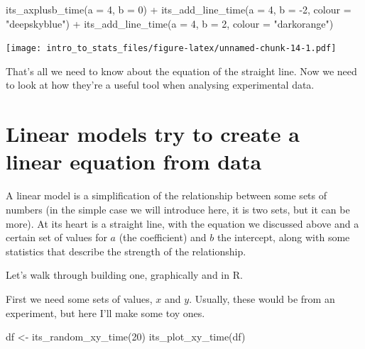 \documentclass[
]{book}
\newenvironment{Shaded}{\begin{snugshade}}{\end{snugshade}}
\newcommand{\AttributeTok}[1]{\textcolor[rgb]{0.77,0.63,0.00}{#1}}
\newcommand{\DecValTok}[1]{\textcolor[rgb]{0.00,0.00,0.81}{#1}}
\newcommand{\FunctionTok}[1]{\textcolor[rgb]{0.00,0.00,0.00}{#1}}
\newcommand{\NormalTok}[1]{#1}
\newcommand{\OtherTok}[1]{\textcolor[rgb]{0.56,0.35,0.01}{#1}}
\newcommand{\SpecialCharTok}[1]{\textcolor[rgb]{0.00,0.00,0.00}{#1}}
\newcommand{\StringTok}[1]{\textcolor[rgb]{0.31,0.60,0.02}{#1}}
\begin{document}
\begin{Shaded}
\begin{Highlighting}[]
\FunctionTok{its\_axplusb\_time}\NormalTok{(}\AttributeTok{a =} \DecValTok{4}\NormalTok{, }\AttributeTok{b =} \DecValTok{0}\NormalTok{) }\SpecialCharTok{+} 
  \FunctionTok{its\_add\_line\_time}\NormalTok{(}\AttributeTok{a =} \DecValTok{4}\NormalTok{, }\AttributeTok{b =} \SpecialCharTok{{-}}\DecValTok{2}\NormalTok{, }\AttributeTok{colour =} \StringTok{"deepskyblue"}\NormalTok{) }\SpecialCharTok{+}
  \FunctionTok{its\_add\_line\_time}\NormalTok{(}\AttributeTok{a =} \DecValTok{4}\NormalTok{, }\AttributeTok{b =} \DecValTok{2}\NormalTok{, }\AttributeTok{colour =} \StringTok{"darkorange"}\NormalTok{)}
\end{Highlighting}
\end{Shaded}

\texttt{[image: intro\_to\_stats\_files/figure-latex/unnamed-chunk-14-1.pdf]}

That's all we need to know about the equation of the straight line. Now we need to look at how they're a useful tool when analysing experimental data.

\hypertarget{linear-models-try-to-create-a-linear-equation-from-data}{%
\section{Linear models try to create a linear equation from data}\label{linear-models-try-to-create-a-linear-equation-from-data}}

A linear model is a simplification of the relationship between some sets of numbers (in the simple case we will introduce here, it is two sets, but it can be more). At its heart is a straight line, with the equation we discussed above and a certain set of values for \(a\) (the coefficient) and \(b\) the intercept, along with some statistics that describe the strength of the relationship.

Let's walk through building one, graphically and in R.

First we need some sets of values, \(x\) and \(y\). Usually, these would be from an experiment, but here I'll make some toy ones.

\begin{Shaded}
\begin{Highlighting}[]
\NormalTok{df }\OtherTok{\textless{}{-}} \FunctionTok{its\_random\_xy\_time}\NormalTok{(}\DecValTok{20}\NormalTok{)}
\FunctionTok{its\_plot\_xy\_time}\NormalTok{(df)}
\end{Highlighting}
\end{Shaded}
\end{document}
